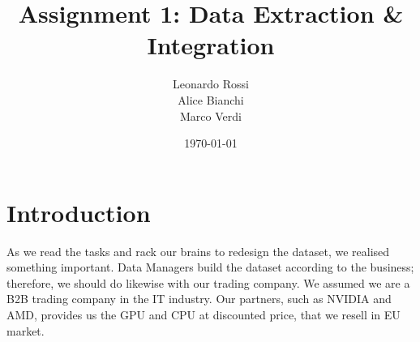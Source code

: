 \documentclass[12pt,a4paper]{article}
\title{\vspace{-2cm}Assignment 1: Data Extraction \& Integration}
\author{Leonardo Rossi \\ Alice Bianchi \\ Marco Verdi} %
\date{\today}
\begin{document}
\maketitle
\thispagestyle{empty}

\tableofcontents
\newpage

\section{Introduction}
As we read the tasks and rack our brains to redesign the dataset, we realised something important. Data Managers build the dataset according to the business; therefore, we should do likewise with our trading company. We assumed we are a B2B trading company in the IT industry. Our partners, such as NVIDIA and AMD, provides us the GPU and CPU at discounted price, that we resell in EU market. 
\end{document}

